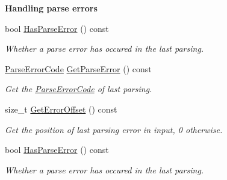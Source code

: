 \begin{Indent}\textbf{ Handling parse errors}\par
\begin{DoxyCompactItemize}
\item 
\mbox{\label{classGenericDocument_a510a0588db4eb372f5d81bc3646578fb}} 
bool \hyperlink{classGenericDocument_a510a0588db4eb372f5d81bc3646578fb}{Has\+Parse\+Error} () const
\begin{DoxyCompactList}\small\item\em Whether a parse error has occured in the last parsing. \end{DoxyCompactList}\item 
\mbox{\label{classGenericDocument_a9400a5bd3169cc6ed545e681ccc06070}} 
\hyperlink{group__RAPIDJSON__ERRORS_ga8d4b32dfc45840bca189ade2bbcb6ba7}{Parse\+Error\+Code} \hyperlink{classGenericDocument_a9400a5bd3169cc6ed545e681ccc06070}{Get\+Parse\+Error} () const
\begin{DoxyCompactList}\small\item\em Get the \hyperlink{group__RAPIDJSON__ERRORS_ga8d4b32dfc45840bca189ade2bbcb6ba7}{Parse\+Error\+Code} of last parsing. \end{DoxyCompactList}\item 
\mbox{\label{classGenericDocument_ae1ef7ca99ced428e9300c68e5142afdb}} 
size\+\_\+t \hyperlink{classGenericDocument_ae1ef7ca99ced428e9300c68e5142afdb}{Get\+Error\+Offset} () const
\begin{DoxyCompactList}\small\item\em Get the position of last parsing error in input, 0 otherwise. \end{DoxyCompactList}\item 
\mbox{\label{classGenericDocument_a510a0588db4eb372f5d81bc3646578fb}} 
bool \hyperlink{classGenericDocument_a510a0588db4eb372f5d81bc3646578fb}{Has\+Parse\+Error} () const
\begin{DoxyCompactList}\small\item\em Whether a parse error has occured in the last parsing. \end{DoxyCompactList}\item 
\mbox{\label{classGenericDocument_a9400a5bd3169cc6ed545e681ccc06070}} 

\end{DoxyCompactItemize}
\end{Indent}
